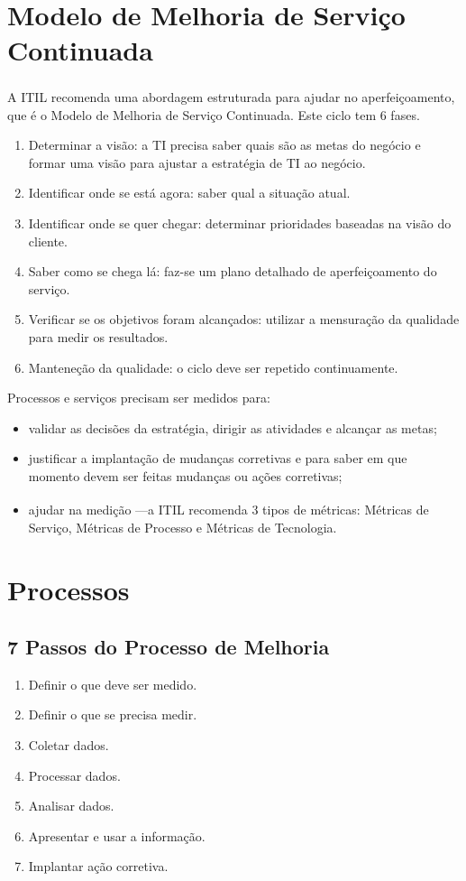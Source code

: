 \section{Modelo de Melhoria de Serviço Continuada}
\label{sec:enhan:modelo}
A ITIL\textsuperscript{\textregistered} recomenda uma abordagem estruturada
para ajudar no aperfeiçoamento, que é o Modelo de Melhoria de Serviço
Continuada. Este ciclo tem 6 fases.
\begin{enumerate}
    \item Determinar a visão: a TI precisa saber quais são as metas do negócio
        e formar uma visão para ajustar a estratégia de TI ao negócio.
	\item Identificar onde se está agora: saber qual a situação atual.
    \item Identificar onde se quer chegar: determinar prioridades baseadas na
        visão do cliente.
    \item Saber como se chega lá: faz-se um plano detalhado de aperfeiçoamento
        do serviço.
    \item Verificar se os objetivos foram alcançados: utilizar a mensuração da
        qualidade para medir os resultados.
	\item Manteneção da qualidade: o ciclo deve ser repetido continuamente.
\end{enumerate}

Processos e serviços precisam ser medidos para:
\begin{itemize}
    \item validar as decisões da estratégia, dirigir as atividades e alcançar
        as metas;
    \item justificar a implantação de mudanças corretivas e para saber em que
        momento devem ser feitas mudanças ou ações corretivas;
    \item ajudar na medição ---a ITIL\textsuperscript{\textregistered}
        recomenda 3 tipos de métricas: Métricas de Serviço, Métricas de
        Processo e Métricas de Tecnologia.
\end{itemize}


\section{Processos}
\label{sec:enhan:processos}
\subsection{7 Passos do Processo de Melhoria}
\begin{enumerate}
	\item Definir o que deve ser medido.
	\item Definir o que se precisa medir.
	\item Coletar dados.
	\item Processar dados.
	\item Analisar dados.
	\item Apresentar e usar a informação.
	\item Implantar ação corretiva.
\end{enumerate}

